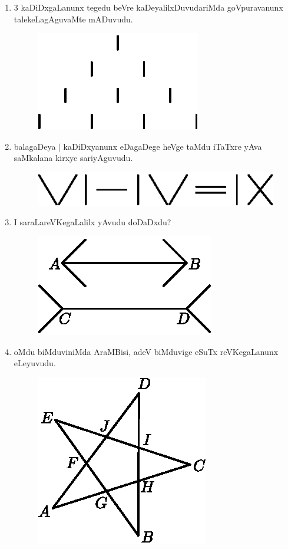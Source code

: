 \begin{enumerate}
\item $3$ kaDiDxgaLanunx tegedu beVre kaDeyalilxDuvudariMda goVpuravanunx talekeLagAguvaMte mADuvudu.
\begin{figure}[H]
\centering
\includegraphics{src/figures/exr42.eps}
\end{figure}

\item balagaDeya $|$ kaDiDxyanunx eDagaDege heVge taMdu iTaTxre yAva saMkalana kirxye sariyAguvudu.
\begin{figure}[H]
\centering
\includegraphics{src/figures/exr43.eps}
\end{figure}

\item I saraLareVKegaLalilx yAvudu doDaDxdu?
\begin{figure}[H]
\centering
\includegraphics{src/figures/exr44.eps}
\end{figure}

\eject

\item oMdu biMduviniMda AraMBisi, adeV biMduvige eSuTx reVKegaLanunx eLeyuvudu.
\begin{figure}[H]
\centering
\includegraphics{src/figures/exr45.eps}
\end{figure}


\end{enumerate}
